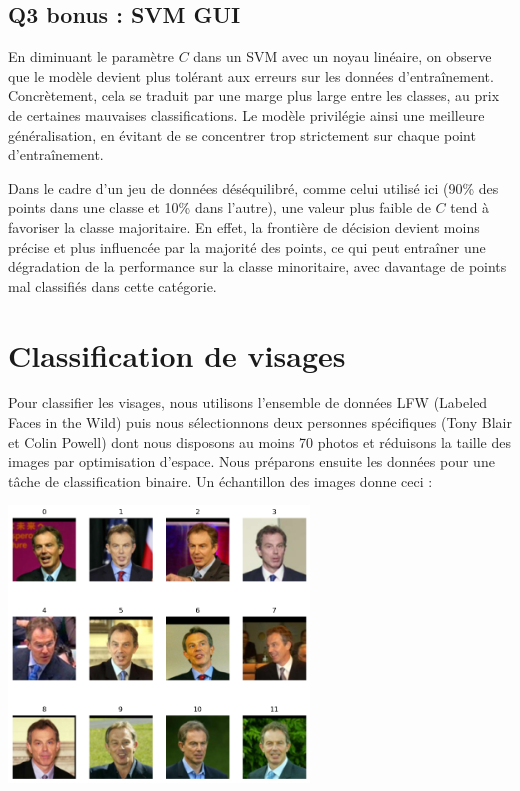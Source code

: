\documentclass{scrartcl}
\begin{document}
\subsection{Q3 bonus : SVM GUI}

\hspace{7pt} En diminuant le paramètre $C$ dans un SVM avec un noyau linéaire, on observe que le modèle devient plus tolérant aux erreurs sur les données d'entraînement. Concrètement, cela se traduit par une marge plus large entre les classes, au prix de certaines mauvaises classifications. Le modèle privilégie ainsi une meilleure généralisation, en évitant de se concentrer trop strictement sur chaque point d'entraînement.\newline

Dans le cadre d'un jeu de données déséquilibré, comme celui utilisé ici (90\% des points dans une classe et 10\% dans l'autre), une valeur plus faible de $C$ tend à favoriser la classe majoritaire. En effet, la frontière de décision devient moins précise et plus influencée par la majorité des points, ce qui peut entraîner une dégradation de la performance sur la classe minoritaire, avec davantage de points mal classifiés dans cette catégorie.

\section{Classification de visages}

\hspace{7pt} Pour classifier les visages, nous utilisons l'ensemble de données LFW (Labeled Faces in the Wild) puis nous sélectionnons deux personnes spécifiques (Tony Blair et Colin Powell) dont nous disposons au moins 70 photos et réduisons la taille des images par optimisation d'espace. Nous préparons ensuite les données pour une tâche de classification binaire. Un échantillon des images donne ceci :

\begin{center}
    \includegraphics[width=0.6\textwidth]{../images/TB-CP.png}
\end{center}
\end{document}
